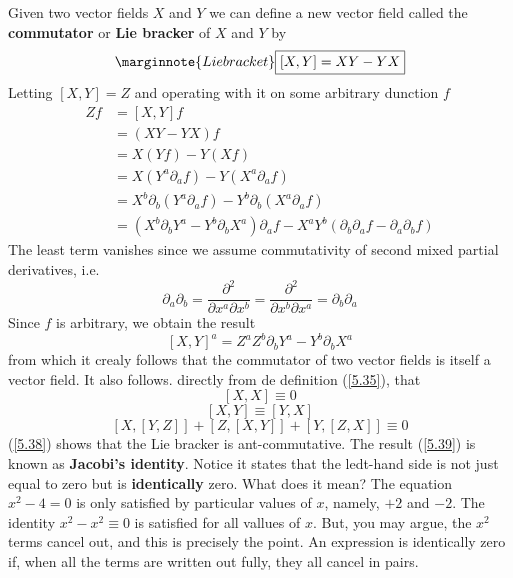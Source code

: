 Given two vector fields $X$ and $Y$ we can define a new vector field called the \textbf{commutator} or \textbf{Lie bracker} of $X$ and $Y$ by
\begin{equation}\label{5.35}\marginnote{Lie bracket}
  \boxed{[X,Y]=XY-YX}
\end{equation}
Letting $[X,Y]=Z$ and operating with it on some arbitrary dunction $f$
\begin{align*}
  Zf&=[X,Y]f\\
    &=(XY-YX)f\\
    &=X(Yf)-Y(Xf)\\
    &=X(Y^{a}\partial_af)-Y(X^{a}\partial_af)\\
    &=X^b\partial_b(Y^{a}\partial_af)-Y^b\partial_b(X^{a}\partial_af)\\
    &=(X^b\partial_bY^{a}-Y^b\partial_bX^{a})\partial_af-X^{a}Y^b(\partial_b\partial_af-\partial_a\partial_bf)
\end{align*}
The least term vanishes since we assume commutativity of second mixed partial derivatives, i.e. $$\partial_a\partial_b=\frac{\partial^2}{\partial x^{a}\partial x^b}=\frac{\partial^2}{\partial x^b\partial x^{a}}=\partial_b\partial_a$$ Since $f$ is arbitrary, we obtain the result
\begin{equation}\label{5.36}
  [X,Y]^{a}=Z^{a}Z^b\partial_bY^{a}-Y^b\partial_bX^{a}
\end{equation}
from which it crealy follows  that the commutator of two vector fields is itself a vector field. It also follows. directly from de definition (\ref{5.35}), that
\begin{equation}\label{5.37}
  [X,X]\equiv 0
\end{equation}
\begin{equation}\label{5.38}
  [X,Y]\equiv [Y,X]
\end{equation}
\begin{equation}\label{5.39}
  [X,[Y,Z]] + [Z,[X,Y]] + [Y,[Z,X]]\equiv 0
\end{equation}
(\ref{5.38}) shows that the Lie bracker is ant-commutative. The result (\ref{5.39}) is known as \textbf{Jacobi's identity}. Notice it states that the ledt-hand side is not just equal to zero but is \textbf{identically} zero. What does it mean? The equation $x^2-4=0$ is only satisfied by particular values of $x$, namely, $+2$ and $-2$. The identity $x^2-x^2\equiv 0$ is satisfied for all vallues of $x$. But, you may argue, the $x^2$ terms cancel out, and this is precisely the point. An expression is identically zero if, when all the terms are written out fully, they all cancel in pairs.








